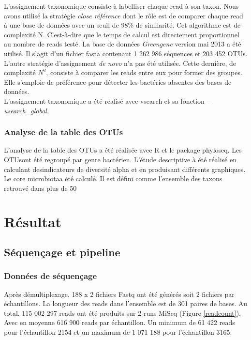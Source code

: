 \documentclass[12pt,a4paper]{article}
\begin{document}
L’assignement taxonomique consiste à labelliser chaque read à son taxon. Nous avons utilisé la stratégie \textit{close référence} dont le rôle est de comparer chaque read à une base de données avec un seuil de 98\% de similarité. Cet algorithme est de complexité N. C'est-à-dire que le temps de calcul est directement proportionnel au nombre de reads testé. La base de données \textit{Greengene} version mai 2013  a été utilisé. Il s'agit d'un fichier fasta contenant 1 262 986 séquences et 203 452 OTUs. \\
L'autre stratégie d'assignement \textit{de novo} n'a pas été utilisée. Cette dernière, de complexité $N^{2}$, consiste à comparer les reads entre eux pour former des groupes. Elle s'emploie de préférence pour détecter les bactéries absentes des bases de données. \\
L'assignement taxonomique a été réalisé avec vsearch et sa fonction \textit{--usearch\_global}. 

\subsubsection{Analyse de la table des OTUs}
L’analyse de la table des OTUs a été réalisée avec R et le package phyloseq. Les OTUsont été regroupé par genre bactérien. L’étude descriptive à été réalisé en calculant desindicateurs de diversité alpha et en produisant différents graphiques. Le core microbiotaa été calculé. Il est défini comme l’ensemble des taxons retrouvé dans plus de 50%


\section{Résultat}
\subsection{Séquençage et pipeline}
\subsubsection{Données de séquençage}
Après démultiplexage, 188 x 2 fichiers Fastq ont été générés soit 2 fichiers par échantillons.
La longueur des reads dans l'ensemble est de 301 paires de bases.
Au total, 115 002 297 reads ont été produits sur 2 runs MiSeq (Figure \ref{readcount}). Avec en moyenne 616 900 reads par échantillon. Un minimum de 61 422 reads pour l’échantillon 2154 et un maximum de 1 071 188 pour l’échantillon 3165. 
\end{document}
